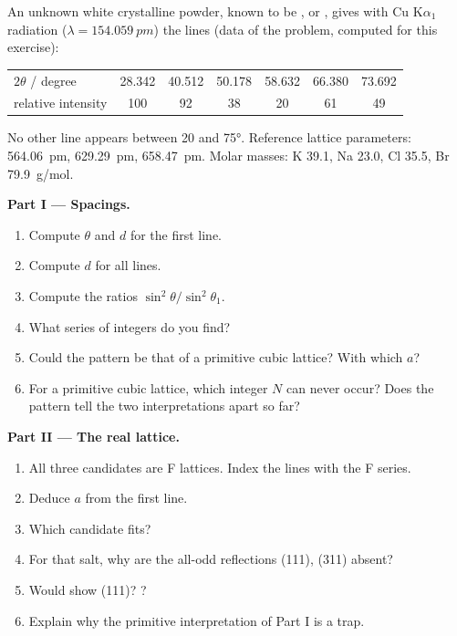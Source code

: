 \begin{problem}
\label{pb:b3:x-ray-diffraction:1}
An unknown white crystalline powder, known to be ,  or ,
gives with Cu K$\alpha_1$ radiation ($\lambda = \qty{154.059}{pm}$) the lines (data of the
problem, computed for this exercise):
\begin{center}\small
\begin{tabular}{lcccccc}
\hline
$2\theta$ / degree & 28.342 & 40.512 & 50.178 & 58.632 & 66.380 & 73.692 \\
relative intensity & 100 & 92 & 38 & 20 & 61 & 49 \\ \hline
\end{tabular}
\end{center}
No other line appears between 20 and \ang{75}. Reference lattice parameters:
 \qty{564.06}{pm},  \qty{629.29}{pm},  \qty{658.47}{pm}. Molar masses:
K 39.1, Na 23.0, Cl 35.5, Br \qty{79.9}{g/mol}.

\medskip\noindent\textbf{Part I --- Spacings.}
\begin{enumerate}
  \item Compute $\theta$ and $d$ for the first line.
  \item Compute $d$ for all lines.
  \item Compute the ratios $\sin^2\theta/\sin^2\theta_1$.
  \item What series of integers do you find?
  \item Could the pattern be that of a primitive cubic lattice? With which $a$?
  \item For a primitive cubic lattice, which integer $N$ can never occur? Does
        the pattern tell the two interpretations apart so far?
\end{enumerate}

\medskip\noindent\textbf{Part II --- The real lattice.}
\begin{enumerate}[resume]
  \item All three candidates are F lattices. Index the lines with the F series.
  \item Deduce $a$ from the first line.
  \item Which candidate fits?
  \item For that salt, why are the all-odd reflections (111), (311) absent?
  \item Would  show (111)? ?
  \item Explain why the primitive interpretation of Part I is a trap.
\end{enumerate}


\end{problem}
